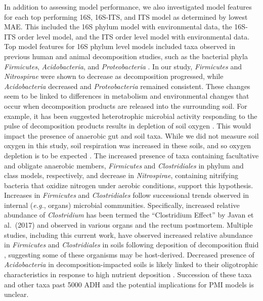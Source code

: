\documentclass[
  10pt,
  letterpaper,
]{article}
\begin{document}
In addition to assessing model performance, we also investigated model
features for each top performing 16S, 16S-ITS, and ITS model as
determined by lowest MAE. This included the 16S phylum model with
environmental data, the 16S-ITS order level model, and the ITS order
level model with environmental data. Top model features for 16S phylum
level models included taxa observed in previous human and animal
decomposition studies, such as the bacterial phyla \emph{Firmicutes},
\emph{Acidobacteria}, and \emph{Proteobacteria}
\citep{cobaugh_functional_2015, metcalf_microbial_2016}. In our study,
\emph{Firmicutes} and \emph{Nitrospirae} were shown to decrease as
decomposition progressed, while \emph{Acidobacteria} decreased and
\emph{Proteobacteria} remained consistent. These changes seem to be
linked to differences in metabolism and environmental changes that occur
when decomposition products are released into the surrounding soil. For
example, it has been suggested heterotrophic microbial activity
responding to the pulse of decomposition products results in depletion
of soil oxygen \citep{taylor_soil_2024, keenan_mortality_2018}. This
would impact the presence of anaerobic gut and soil taxa. While we did
not measure soil oxygen in this study, soil respiration was increased in
these soils, and so oxygen depletion is to be expected
\citep{mason_body_2022}. The increased presence of taxa containing
facultative and obligate anaerobic members, \emph{Firmicutes} and
\emph{Clostridiales} in phylum and class models, respectively, and
decrease in \emph{Nitrospirae}, containing nitrifying bacteria that
oxidize nitrogen under aerobic conditions, support this hypothesis.
Increases in \emph{Firmicutes} and \emph{Clostridiales} follow
successional trends observed in internal (\emph{e.g.}, organs) microbial
communities. Specifically, increased relative abundance of
\emph{Clostridium} has been termed the ``Clostridium Effect'' by Javan
et al.~(2017) \citep{javan_cadaver_2017} and observed in various organs
\citep{javan_human_2016, javan_cadaver_2017} and the rectum
\citep{debruyn_postmortem_2017} postmortem. Multiple studies, including
this current work, have observed increased relative abundance in
\emph{Firmicutes} and \emph{Clostridiales} in soils following deposition
of decomposition fluid
\citep{cobaugh_functional_2015, mason_microbial_2023, singh_temporal_2018, keenan_microbial_2023},
suggesting some of these organisms may be host-derived. Decreased
presence of \emph{Acidobacteria} in decomposition-impacted soils is
likely linked to their oligotrophic characteristics in response to high
nutrient deposition \citep{cobaugh_functional_2015, fierer_toward_2007}.
Succession of these taxa and other taxa past 5000 ADH and the potential
implications for PMI models is unclear.
\end{document}
